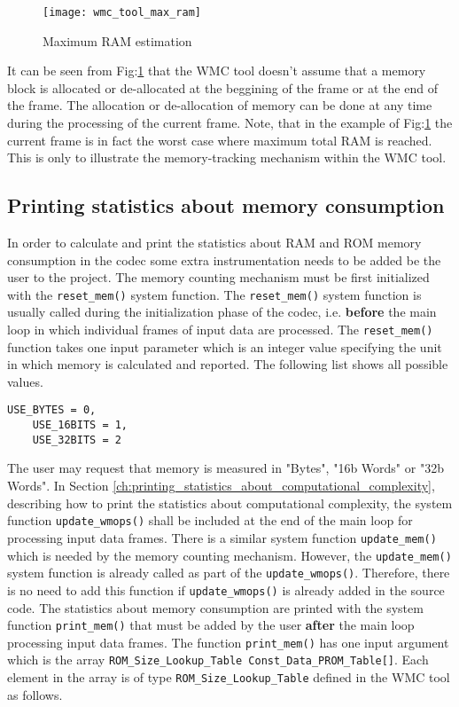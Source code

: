 \begin{figure}[hbtp]
\begin{center}
\texttt{[image: wmc\_tool\_max\_ram]}
\end{center}
\caption{Maximum RAM estimation}
\label{fig:wmc_tool_max_ram}
\end{figure}

It can be seen from Fig:\ref{fig:wmc_tool_max_ram} that the WMC tool doesn't assume that a memory block is allocated or de-allocated at the beggining of the frame or at the end of the frame. The allocation or de-allocation of memory can be done at any time during the processing of the current frame. Note, that in the example of Fig:\ref{fig:wmc_tool_max_ram} the current frame is in fact the worst case where maximum total RAM is reached. This is only to illustrate the memory-tracking mechanism within the WMC tool.

\subsection{Printing statistics about memory consumption}
\label{ch:printing_statistics_about_memory_consumption}

In order to calculate and print the statistics about RAM and ROM memory consumption in the codec some extra instrumentation needs to be added be the user to the project. The memory counting mechanism must be first initialized with the \verb|reset_mem()| system function. The \verb|reset_mem()| system function is usually called during the initialization phase of the codec, i.e. \textbf{before} the main loop in which individual frames of input data are processed. The \verb|reset_mem()| function takes one input parameter which is an integer value specifying the unit in which memory is calculated and reported. The following list shows all possible values.

\begin{Verbatim}[fontsize=\small]
    USE_BYTES = 0,
    USE_16BITS = 1,
    USE_32BITS = 2
\end{Verbatim}

The user may request that memory is measured in "Bytes", "16b Words" or "32b Words". In Section \ref{ch:printing_statistics_about_computational_complexity}, describing how to print the statistics about computational complexity, the system function \verb|update_wmops()| shall be included at the end of the main loop for processing input data frames. There is a similar system function \verb|update_mem()| which is needed by the memory counting mechanism. However, the \verb|update_mem()| system function is already called as part of the \verb|update_wmops()|. Therefore, there is no need to add this function if \verb|update_wmops()| is already added in the source code. The statistics about memory consumption are printed with the system function \verb|print_mem()| that must be added by the user \textbf{after} the main loop processing input data frames. The function \verb|print_mem()| has one input argument which is the array \verb|ROM_Size_Lookup_Table Const_Data_PROM_Table[]|. Each element in the array is of type \verb|ROM_Size_Lookup_Table| defined in the WMC tool as follows.


